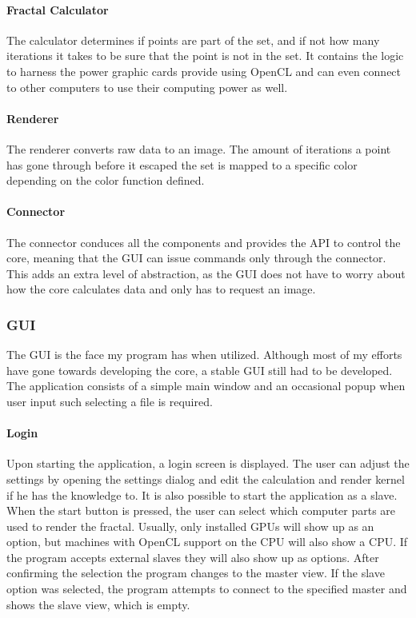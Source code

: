 \documentclass[10pt,a4paper,titlepage]{article}
\begin{document}
	\paragraph{Fractal Calculator}
	The calculator determines if points are part of the set, and if not how many iterations it takes to be sure that the point is not in the set. It contains the logic to harness the power graphic cards provide using OpenCL and can even connect to other computers to use their computing power as well.
	\paragraph{Renderer}
	The renderer converts raw data to an image. The amount of iterations a point has gone through before it escaped the set is mapped to a specific color depending on the color function defined.
	\paragraph{Connector}
	The connector conduces all the components and provides the API to control the core, meaning that the GUI can issue commands only through the connector. This adds an extra level of abstraction, as the GUI does not have to worry about how the core calculates data and only has to request an image. 
	\subsubsection{GUI}
	The GUI is the face my program has when utilized. Although most of my efforts have gone towards developing the core, a stable GUI still had to be developed. The application consists of a simple main window and an occasional popup when user input such selecting a file is required.
	\paragraph{Login}
	Upon starting the application, a login screen is displayed. The user can adjust the settings by opening the settings dialog and edit the calculation and render kernel if he has the knowledge to. It is also possible to start the application as a slave.\\
	When the start button is pressed, the user can select which computer parts are used to render the fractal. Usually, only installed GPUs will show up as an option, but machines with OpenCL support on the CPU will also show a CPU. If the program accepts external slaves they will also show up as options. After confirming the selection the program changes to the master view. If the slave option was selected, the program attempts to connect to the specified master and shows the slave view, which is empty.
\end{document}
